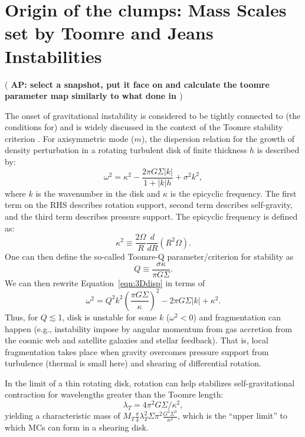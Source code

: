 \documentclass[iop]{emulateapj} %
\newcommand{\AP}[1]{({\bf \color{apcolor} AP: #1})}
\begin{document}
\section{Origin of the clumps: Mass Scales set by Toomre and Jeans Instabilities}   \label{sec:Q}

\AP{select a snapshot, put it face on and calculate the toomre parameter map similarly to what done in \citet{Inoue16a}}

The onset of gravitational instability is considered to be tightly connected to (the conditions for) \SF \citep[e.g.,][]{Kennicutt89a, Li05b, Li06a}
and is widely discussed in the context of the Toomre stability criterion \citep{Toomre64a, Goldreich65b}.
For axisymmetric mode ($m$), the dispersion relation for the growth of density perturbation in a rotating turbulent disk
of finite thickness $h$
is described by:
\begin{equation}
\omega^2 = \kappa^2 - \frac{2\pi G \Sigma |k|}{1 + |k| h} + \sigma^2 k^2,
\label{eqn:3Ddisp}
\end{equation}
where $k$ is the wavenumber in the disk and $\kappa$ is the epicyclic frequency.
The first term on the RHS describes rotation support, second term describes self-gravity, and
the third term describes pressure support.
The epicyclic frequency is defined as:
\begin{equation}
\kappa^2\equiv\frac{2\Omega}{R}\frac{d}{dR}\left(R^2\Omega\right).
\label{eqn:kappa}
\end{equation}
One can then define the so-called Toomre-Q parameter/criterion for stability as
\begin{equation}
Q\equiv\frac{\sigma\kappa}{\pi G \Sigma}.
\label{eqn:Q}
\end{equation}
We can then rewrite Equation~\ref{eqn:3Ddisp} in terms of
\begin{equation}
\omega^2 = Q^2 k^2 \left(\frac{\pi G \Sigma}{\kappa}\right)^2 - 2\pi G \Sigma |k| + \kappa^2.
\end{equation}
Thus, for $Q\lesssim$1, disk is unstable for some $k$ ($\omega^2 < 0$)
and fragmentation can happen
(e.g., instability impose by angular momentum from gas accretion from the cosmic web and
satellite galaxies and stellar feedback).
That is, local fragmentation takes place when gravity overcomes pressure support
from turbulence (thermal is small here) and shearing of differential rotation.

In the limit of a thin rotating disk, rotation can help stabilizes
self-gravitational contraction for wavelengths greater than the Toomre length:
\begin{equation}
\lambda_T = 4\pi^2 G\Sigma/\kappa^2,
\end{equation}
yielding a characteristic mass of $M_T$\eq$\frac{\pi}{4}{\lambda_T^2}{\Sigma}$$\pi^2\frac{G^2\Sigma^3}{\kappa^4}$,
which is the ``upper limit'' to which MCs can form in a shearing disk.
\end{document}
